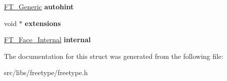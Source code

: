 \begin{DoxyCompactItemize}
\item 
\hypertarget{struct_f_t___face_rec___a34ba9b1367f1b2d13676043b8da3ea73}{
\hyperlink{struct_f_t___generic__}{FT\_\-Generic} {\bfseries autohint}}
\label{struct_f_t___face_rec___a34ba9b1367f1b2d13676043b8da3ea73}

\item 
\hypertarget{struct_f_t___face_rec___a8b24f993e38da597d3e0273267890f49}{
void $\ast$ {\bfseries extensions}}
\label{struct_f_t___face_rec___a8b24f993e38da597d3e0273267890f49}

\item 
\hypertarget{struct_f_t___face_rec___aed9a1267cddcbe790f0591471c886537}{
\hyperlink{struct_f_t___face___internal_rec__}{FT\_\-Face\_\-Internal} {\bfseries internal}}
\label{struct_f_t___face_rec___aed9a1267cddcbe790f0591471c886537}

\end{DoxyCompactItemize}


The documentation for this struct was generated from the following file:\begin{DoxyCompactItemize}
\item 
src/libs/freetype/freetype.h\end{DoxyCompactItemize}
